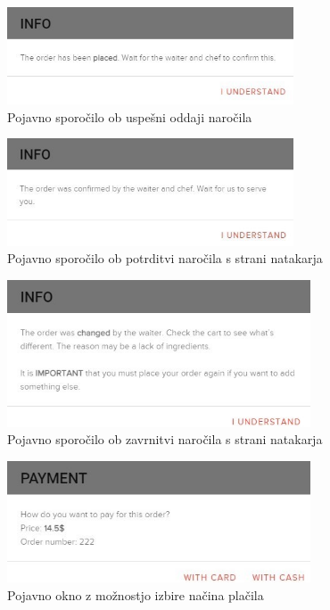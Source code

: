 \documentclass[a4paper, 12pt]{book}
\begin{document}
\begin{figure}[!htb]
\begin{center}
\includegraphics[width=8.5cm]{gost_5.jpg}
\caption{Pojavno sporočilo ob uspešni oddaji naročila}
\label{Gost_5}
\end{center}
\end{figure}
\begin{figure}[!htb]
\begin{center}
\includegraphics[width=8.5cm]{gost_6.jpg}
\caption{Pojavno sporočilo ob potrditvi naročila s strani natakarja}
\label{Gost_6}
\end{center}
\end{figure}

\begin{figure}[!htb]
\begin{center}
\includegraphics[width=9cm]{gost_8.jpg}
\caption{Pojavno sporočilo ob zavrnitvi naročila s strani natakarja}
\label{Gost_8}
\end{center}
\end{figure}
\begin{figure}[!htb]
\begin{center}
\includegraphics[width=9cm]{gost_7.jpg}
\caption{Pojavno okno z možnostjo izbire načina plačila}
\label{Gost_7}
\end{center}
\end{figure}
\end{document}
